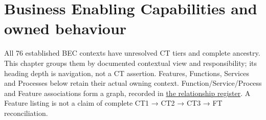 \chapter{Business Enabling Capabilities and owned behaviour}\label{model:bec}
All 76 established BEC contexts have unresolved CT tiers and complete ancestry. This chapter groups them by documented contextual view and responsibility; its heading depth is navigation, not a CT assertion. Features, Functions, Services and Processes below retain their actual owning context. Function/Service/Process and Feature associations form a graph, recorded in \hyperref[model:relationships]{the relationship register}. A Feature listing is not a claim of complete CT1 → CT2 → CT3 → FT reconciliation.

